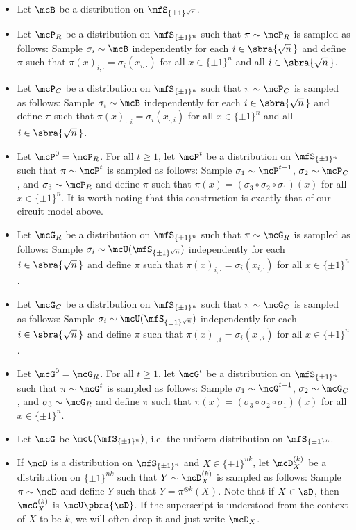 \begin{itemize}
    \item Let $\mcB$ be a distribution on $\mfS_{\{\pm1\}^{\sqrt{n}}}$.
    
    \item Let $\mcP_R$ be a distribution on $\mfS_{\{\pm1\}^{n}}$ such that $\pi \sim \mcP_R$ is sampled as follows: 
          Sample $\sigma_i \sim \mcB$ independently for each $i \in \sbra{\sqrt{n}\,}$ and define $\pi$ such that $\pi(x)_{i, \cdot} = \sigma_i(x_{i, \cdot})$ for all $x \in \{\pm1\}^{n}$ and all $i \in \sbra{\sqrt{n}\,}$. 
    \item Let $\mcP_C$ be a distribution on $\mfS_{\{\pm1\}^{n}}$ such that $\pi \sim \mcP_C$ is sampled as follows: 
          Sample $\sigma_i \sim \mcB$ independently for each $i \in \sbra{\sqrt{n}\,}$ and define $\pi$ such that $\pi(x)_{\cdot, i} = \sigma_i(x_{\cdot, i})$ for all $x \in \{\pm1\}^{n}$ and all $i \in \sbra{\sqrt{n}\,}$. 
    \item Let $\mcP^0 = \mcP_R$. For all $t \ge 1$, let $\mcP^t$ be a distribution on $\mfS_{\{\pm1\}^{n}}$ such that $\pi \sim \mcP^t$ is sampled as follows:
          Sample $\sigma_1 \sim \mcP^{t-1}$, $\sigma_2 \sim \mcP_C$, and $\sigma_3 \sim \mcP_R$ and define $\pi$ such that $\pi(x) = (\sigma_3 \circ \sigma_2 \circ \sigma_1)(x)$ for all $x \in \{\pm1\}^{n}$. It is worth noting that this construction is exactly that of our circuit model above.
    \item Let $\mcG_R$ be a distribution on $\mfS_{\{\pm1\}^{n}}$ such that $\pi \sim \mcG_R$ is sampled as follows:
          Sample $\sigma_i \sim \mcU(\mfS_{\{\pm1\}^{\sqrt{n}}})$ independently for each $i \in \sbra{\sqrt{n}\,}$ and define $\pi$ such that $\pi(x)_{i, \cdot} = \sigma_i(x_{i,\cdot})$ for all $x \in \{\pm1\}^{n}$. 
    \item Let $\mcG_C$ be a distribution on $\mfS_{\{\pm1\}^{n}}$ such that $\pi \sim \mcG_C$ is sampled as follows:
          Sample $\sigma_i \sim \mcU(\mfS_{\{\pm1\}^{\sqrt{n}}})$ independently for each $i \in \sbra{\sqrt{n}\,}$ and define $\pi$ such that $\pi(x)_{\cdot, i} = \sigma_i(x_{\cdot, i})$ for all $x \in \{\pm1\}^{n}$. 
    \item Let $\mcG^0 = \mcG_R$. For all $t \ge 1$, let $\mcG^t$ be a distribution on $\mfS_{\{\pm1\}^{n}}$ such that $\pi \sim \mcG^t$ is sampled as follows:
          Sample $\sigma_1 \sim \mcG^{t-1}$, $\sigma_2 \sim \mcG_C$, and $\sigma_3 \sim \mcG_R$ and define $\pi$ such that $\pi(x) = (\sigma_3 \circ \sigma_2 \circ \sigma_1)(x)$ for all $x \in \{\pm1\}^{n}$.
    \item Let $\mcG$ be $\mcU(\mfS_{\{\pm1\}^{n}})$, i.e. the uniform distribution on $\mfS_{\{\pm1\}^{n}}$.
    \item If $\mcD$ is a distribution on $\mfS_{\{\pm1\}^{n}}$ and $X \in \{\pm1\}^{nk}$, let $\mcD^{(k)}_X$ be a distribution on $\{\pm1\}^{nk}$ such that $Y \sim \mcD^{(k)}_X$ is sampled as follows:
          Sample $\pi \sim \mcD$ and define $Y$ such that $Y = \pi^{\otimes k}(X)$. 
          Note that if $X \in \sD$, then $\mcG^{(k)}_X$ is $\mcU\pbra{\sD}$. If the superscript is understood from the context of $X$ to be $k$, we will often drop it and just write $\mcD_X$.
\end{itemize}



